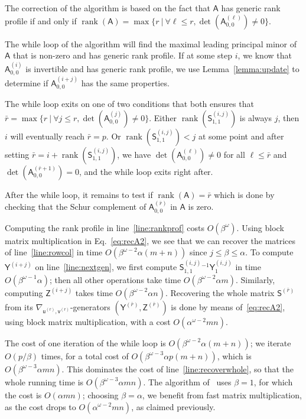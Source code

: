 \documentclass{sig-alternate}
\newcommand{\vu}{\ensuremath{\mathsf{u}}}
\newcommand{\vv}{\ensuremath{\mathsf{v}}}
\newcommand{\mA}{\ensuremath{\mathsf{A}}}
\newcommand{\mS}{\ensuremath{\mathsf{S}}}
\newcommand{\mY}{\ensuremath{\mathsf{Y}}}
\newcommand{\mZ}{\ensuremath{\mathsf{Z}}}
\newcommand{\rank}{\ensuremath{\operatorname{rank}}}
\begin{document}
\smallskip{}
The correction of the algorithm is based on the fact that $\mA$ has
generic rank profile if and only if
$\rank(\mA) = \max\{ r \ |\  \forall \ell \leq r, \det(\mA^{(\ell)}_{0,0}) \neq
0 \}$.

The while loop of the algorithm will find the maximal leading
principal minor of $\mA$ that is non-zero and has generic rank
profile. If at some step $i$, we know that $\mA^{(i)}_{0,0}$ is
invertible and has generic rank profile, we use
Lemma~\ref{lemma:update} to determine if $\mA^{(i+j)}_{0,0}$ has the
same properties.

The while loop exits on one of two conditions that both ensures that
$\bar{r} = \max\{ r \ |\ \forall j \leq r, \det(\mA^{(j)}_{0,0}) \neq
0 \}$.
Either $\rank(\mS^{(i,j)}_{1,1})$ is always $j$, then $i$ will
eventually reach $\bar{r}=p$. Or $\rank(\mS^{(i,j)}_{1,1})<j$ at some
point and after setting $\bar{r}=i+\rank( \mS^{(i,j)}_{1,1})$, we
have $\det(\mA^{(\ell)}_{0,0}) \neq 0$ for all $\ell \leq \bar{r}$
and $\det(\mA^{(\bar{r}+1)}_{0,0}) = 0$, and the while loop exits
right after.

After the while loop, it remains to test if $\rank(\mA) = \bar{r}$
which is done by checking that the Schur complement of
$\mA^{(\bar{r})}_{0,0}$ in $\mA$ is zero.

\smallskip{}
Computing the rank profile in line~\ref{line:rankprof} costs
$O(\beta^\omega)$.  Using block matrix multiplication in
Eq.~\eqref{eq:recA2}, we see that we can recover the matrices of
line~\ref{line:rowcol} in time $O(\beta^{\omega-2} \alpha (m+n))$
since $j \le \beta \le \alpha$.  To compute $\mY^{(i+j)}$ on
line~\ref{line:nextgen}, we first compute
$\mS^{(i,j)}_{1,1}{}^{-1} \mY^{(i,j)}_1$ in time
$O(\beta^{\omega-1} \alpha)$; then all other operations take time
$O(\beta^{\omega-2} \alpha m)$.  Similarly, computing $\mZ^{(i+j)}$
takes time $O(\beta^{\omega-2} \alpha n)$.  Recovering the whole
matrix $\mS^{(\bar{r})}$ from its
$\nabla_{\vu^{(\bar{r})},\vv^{(\bar{r})}}$-generators
$(\mY^{(\bar{r})},\mZ^{(\bar{r})})$ is done by means
of~\eqref{eq:recA2}, using block matrix multiplication, with a cost
$O(\alpha^{\omega-2} mn)$.

The cost of one iteration of the while loop is
$O(\beta^{\omega-2} \alpha (m+n))$; we iterate $O(p/\beta)$ times, for
a total cost of $O(\beta^{\omega-3} \alpha p(m+n))$, which is
$O(\beta^{\omega-3} \alpha mn)$. This dominates the cost of
line~\ref{line:recoverwhole}, so that the whole running time is
$O(\beta^{\omega-3} \alpha mn)$. The algorithm of~\cite{Mouilleron08}
uses $\beta=1$, for which the cost is $O(\alpha mn)$; choosing
$\beta=\alpha$, we benefit from fast matrix multiplication, as the
cost drops to $O(\alpha^{\omega-2} mn)$, as claimed previously.
\end{document}
